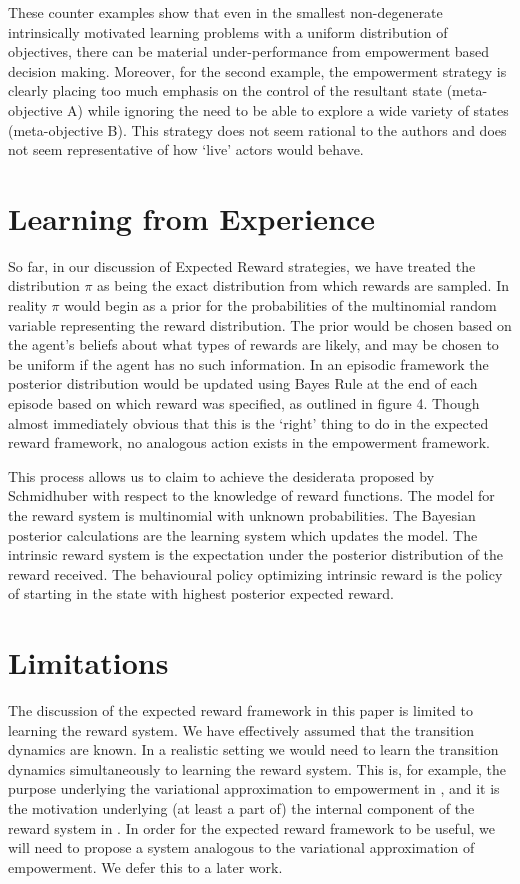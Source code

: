 \documentclass{article}
\begin{document}
These counter examples show that even in the smallest non-degenerate intrinsically motivated learning problems with a uniform distribution of objectives, there can be material under-performance from empowerment based decision making. Moreover, for the second example, the empowerment strategy is clearly placing too much emphasis on the control of the resultant state (meta-objective A) while ignoring the need to be able to explore a wide variety of states (meta-objective B). This strategy does not seem rational to the authors and does not seem representative of how `live' actors would behave.

\section{Learning from Experience}
So far, in our discussion of Expected Reward strategies, we have treated the distribution $\pi$ as being the exact distribution from which rewards are sampled. In reality $\pi$ would begin as a prior for the probabilities of the multinomial random variable representing the reward distribution. The prior would be chosen based on the agent's beliefs about what types of rewards are likely, and may be chosen to be uniform if the agent has no such information. In an episodic framework the posterior distribution would be updated using Bayes Rule at the end of each episode based on which reward was specified, as outlined in figure 4. Though almost immediately obvious that this is the `right' thing to do in the expected reward framework, no analogous action exists in the empowerment framework. 

This process allows us to claim to achieve the desiderata proposed by Schmidhuber with respect to the knowledge of reward functions. The model for the reward system is multinomial with unknown probabilities. The Bayesian posterior calculations are the learning system which updates the model. The intrinsic reward system is the expectation under the posterior distribution of the reward received. The behavioural policy optimizing intrinsic reward is the policy of starting in the state with highest posterior expected reward.

\section{Limitations}
The discussion of the expected reward framework in this paper is limited to learning the reward system. We have effectively assumed that the transition dynamics are known. In a realistic setting we would need to learn the transition dynamics simultaneously to learning the reward system. This is, for example, the purpose underlying the variational approximation to empowerment in \cite{mohamed2015variational}, and it is the motivation underlying (at least a part of) the internal component of the reward system in \cite{schmidhuber2010formal}. In order for the expected reward framework to be useful, we will need to propose a system analogous to the variational approximation of empowerment. We defer this to a later work.
\end{document}
